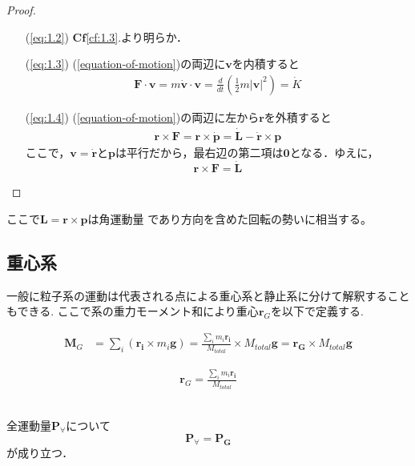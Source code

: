 \documentclass[dvipdfmx,uplatex]{jsarticle}
\begin{document}
\begin{proof}\mbox{}
  \begin{enumerate}
    \item[(\ref{eq:1.2})] $\mathbf{Cf}$\ref{cf:1.3}.より明らか．
    \item[(\ref{eq:1.3})] (\ref{equation-of-motion})の両辺に$\bm{v}$を内積すると
    \begin{align*}
      \bm{F} \cdot \bm{v} = m \dot{\bm{v}} \cdot \bm{v} = \frac{d}{dt} \left( \frac{1}{2} m | \bm{v} |^2 \right) = \dot{K}
    \end{align*}
    \item[(\ref{eq:1.4})] (\ref{equation-of-motion})の両辺に左から$\bm{r}$を外積すると
    \begin{align*}
      \bm{r} \times \bm{F} = \bm{r} \times \dot{\bm{p}} = \dot{\bm{L}} - \dot{\bm{r}} \times \bm{p}
    \end{align*}
    ここで，$\bm{v} = \dot{\bm{r}}$と$\bm{p}$は平行だから，最右辺の第二項は$\bm{0}$となる．ゆえに，
    \begin{equation*}
      \bm{r} \times \bm{F} = \dot{\bm{L}}
    \end{equation*}
  \end{enumerate}
\end{proof}

ここで$\bm{L} = \bm{r} \times \bm{p}$は角運動量
であり方向を含めた回転の勢いに相当する。


\subsection{重心系}
一般に粒子系の運動は代表される点による重心系と静止系に分けて解釈することもできる.
ここで系の重力モーメント和により重心$\bm{r}_G$を以下で定義する.

\begin{align*}
  \bm{M}_G &= \sum_i (\bm{r_i} \times m_i \bm{g}) = \frac{\sum\limits_i m_i \bm{r_i}}{M_{total}} \times M_{total} \bm{g} = \bm{r_G} \times M_{total} \bm{g}
\end{align*}

\begin{defi}
  \begin{align*}
    \bm{r}_G =  \frac{\sum\limits_i m_i \bm{r_i}}{M_{total}}
  \end{align*}
\end{defi}

\begin{theo}\mbox{}\\
  全運動量$ \bm{P}_{\forall} $について
  \begin{equation*}
    \bm{P}_{\forall} = \bm{P_G}
  \end{equation*}
  が成り立つ．
\end{theo}
\end{document}
